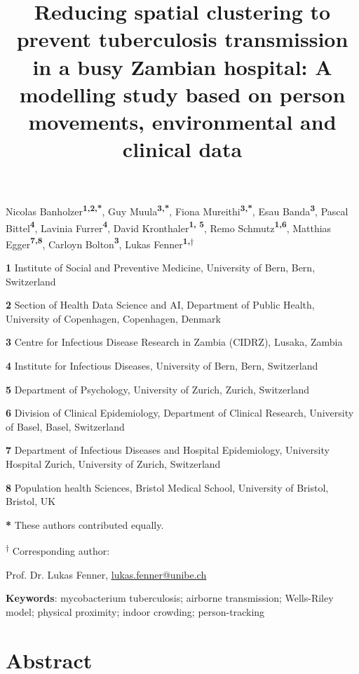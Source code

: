 \documentclass[11pt]{article}
\title{\phantomsection\label{_5drfaezi3ao9}{}\textbf{Reducing spatial clustering to prevent tuberculosis transmission in a busy Zambian hospital: A modelling study based on person movements, environmental and clinical data}}
\author{}
\date{}
\begin{document}
\maketitle

Nicolas Banholzer\textbf{\textsuperscript{1,2,*}}, Guy Muula\textbf{\textsuperscript{3,*}}, Fiona Mureithi\textbf{\textsuperscript{3,*}}, Esau Banda\textbf{\textsuperscript{3}}, Pascal Bittel\textbf{\textsuperscript{4}}, Lavinia Furrer\textbf{\textsuperscript{4}}, David Kronthaler\textbf{\textsuperscript{1, 5}}, Remo Schmutz\textbf{\textsuperscript{1,6}}, Matthias Egger\textbf{\textsuperscript{7,8}}, Carloyn Bolton\textbf{\textsuperscript{3}}, Lukas Fenner\textbf{\textsuperscript{1,$\dagger$}}

\textbf{1} Institute of Social and Preventive Medicine, University of Bern, Bern, Switzerland

\textbf{2} Section of Health Data Science and AI, Department of Public Health, University of Copenhagen, Copenhagen, Denmark

\textbf{3} Centre for Infectious Disease Research in Zambia (CIDRZ), Lusaka, Zambia

\textbf{4} Institute for Infectious Diseases, University of Bern, Bern, Switzerland

\textbf{5} Department of Psychology, University of Zurich, Zurich, Switzerland

\textbf{6} Division of Clinical Epidemiology, Department of Clinical Research, University of Basel, Basel, Switzerland

\textbf{7} Department of Infectious Diseases and Hospital Epidemiology, University Hospital Zurich, University of Zurich, Switzerland

\textbf{8} Population health Sciences, Bristol Medical School, University of Bristol, Bristol, UK

\textbf{*} These authors contributed equally.

\textsuperscript{$\dagger$} Corresponding author:

Prof. Dr. Lukas Fenner, \href{mailto:lukas.fenner@unibe.ch}{\ul{lukas.fenner@unibe.ch}}

\textbf{Keywords}: mycobacterium tuberculosis; airborne transmission; Wells-Riley model; physical proximity; indoor crowding; person-tracking

\section{Abstract}\label{abstract}
\end{document}
